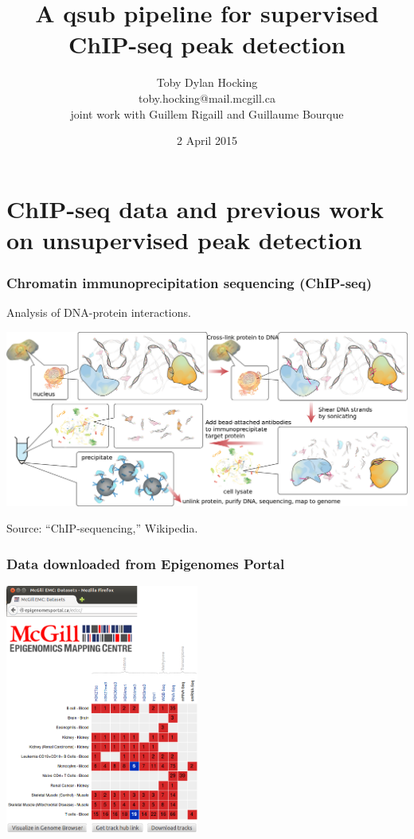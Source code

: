\documentclass{beamer}
\begin{document}
\title{A qsub pipeline for 
  supervised ChIP-seq peak detection} 

\author{
  Toby Dylan Hocking\\
  toby.hocking@mail.mcgill.ca\\
  joint work with Guillem Rigaill and Guillaume Bourque}

\date{2 April 2015}

\maketitle

\section{ChIP-seq data and previous work on unsupervised peak
  detection}


\begin{frame}
  \frametitle{Chromatin immunoprecipitation sequencing (ChIP-seq)}
  Analysis of DNA-protein interactions.

  \includegraphics[width=\textwidth]{Chromatin_immunoprecipitation_sequencing_wide.png}

  Source: ``ChIP-sequencing,'' Wikipedia.
\end{frame}

\begin{frame}
  \frametitle{Data downloaded from Epigenomes Portal}
  \includegraphics[width=2.5in]{screenshot-samples}
\end{frame}
\end{document}
